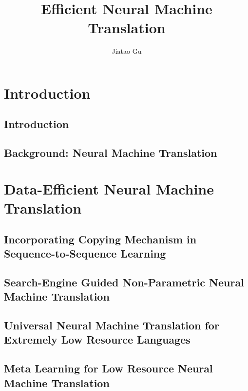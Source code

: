 \documentclass[12pt]{report}
\begin{document}
\title{Efficient Neural Machine Translation}
\author{Jiatao Gu}

\beforepreface


\afterpreface

\part{Introduction}
\chapter{Introduction}
\label{intro}


\chapter[Background]{Background: Neural Machine Translation}
\label{background}


\part{Data-Efficient Neural Machine Translation}
\chapter[Copying Mechanism]{Incorporating Copying Mechanism in Sequence-to-Sequence Learning}
\label{copy}


\chapter[Non-Parametric Neural Machine Translation]{Search-Engine Guided Non-Parametric Neural Machine Translation}
\label{seg-nmt}


\chapter[Universal Neural Machine Translation]{Universal Neural Machine Translation for Extremely Low Resource Languages}
\label{ulr}


\chapter[Meta Learning for Neural Machine Translation]{Meta Learning for Low Resource Neural Machine Translation}
\label{MetaNMT}

\end{document}
